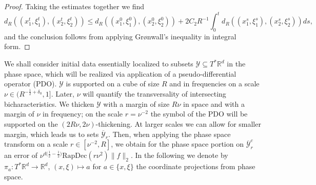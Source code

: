 \documentclass{amsart}
\theoremstyle{definition}
\newcommand{\R}{\mathbb{R}}
\begin{document}
\begin{proof}
Taking the estimates together we find
\begin{equation*}
    d_R((x_1^t,\xi_1^t),(x_2^t,\xi_2^t)) \leq d_R((x_1^0,\xi_1^0),(x_2^0,\xi_2^0)) +2  C_2 R^{-1} \int_0^t d_R((x_1^s,\xi_1^s),(x_2^s,\xi_2^s)) ds,
\end{equation*}
and the conclusion follows from applying Gr\o nwall's inequality in integral form.
\end{proof}

\smallskip

We shall consider initial data essentially localized to subsets $\mathcal{Y} \subseteq T^* \R^d$ in the phase space, which will be realized via application of a pseudo-differential operator (PDO). $\mathcal{Y}$ is supported on a cube of size $R$ and in frequencies on a scale $\nu \in (R^{-\frac{1}{2}+\delta_0},1]$. Later, $\nu$ will quantify the transversality of intersecting bicharacteristics. We thicken $\mathcal{Y}$ with a margin of size $R \nu$ in space and with a margin of $\nu$ in frequency; on the scale $r = \nu^{-2}$ the symbol of the PDO will be supported on the $(2 R \nu,2 \nu)$-thickening. At larger scales we can allow for smaller margin, which leads us to sets $\overline{\mathcal{Y}}_r$. Then, when applying the phase space transform on a scale $r \in [\nu^{-2},R]$, we obtain for the phase space portion on $\overline{\mathcal{Y}}_r^c$ an error of $\nu^{d \big( \frac{1}{2}- \frac{1}{2}\big)} \text{RapDec}(r \nu^2) \| f \|_2$. In the following we denote by $\pi_a: T^* \R^d \to \R^d$, $(x,\xi) \mapsto a$ for $a \in \{x,\xi\}$ the coordinate projections from phase space. 
\end{document}
